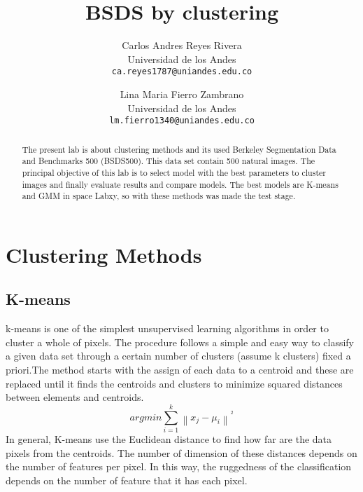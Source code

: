 \documentclass[10pt,twocolumn,letterpaper]{article}
\begin{document}
\title{BSDS by clustering  }

\author{Carlos Andres Reyes Rivera\\
Universidad de los Andes\\
{\tt\small ca.reyes1787@uniandes.edu.co}
\and
Lina Maria Fierro Zambrano\\
Universidad de los Andes\\
{\tt\small lm.fierro1340@uniandes.edu.co}
}

\maketitle

\begin{abstract}

The present lab is about clustering methods and its used Berkeley Segmentation Data and Benchmarks 500 (BSDS500). This data set contain 500 natural images. The principal objective of this lab is to select model with the best parameters to cluster images and finally evaluate results and compare models. The best models are K-means and GMM in space Labxy, so with these methods was made the test stage. 


\end{abstract}

\section{Clustering Methods}

\subsection{K-means}
k-means is one of the simplest unsupervised learning algorithms in order to cluster a whole of pixels. The procedure follows a simple and easy way to classify a given data set through a certain number of clusters (assume k clusters) fixed a priori.The method starts with the assign of each data to a centroid and these are replaced until it finds the centroids and clusters to minimize squared distances between elements and centroids.\cite{Arbelaez}\\
\begin{equation} argmin\sum_{i=1}^{k} \left \| x_{j}-\mu _{i} \right \|^{^{2}}
\end{equation}
In general, K-means use the Euclidean distance to find how far are the data pixels from the centroids. The number of dimension of these distances depends on the number of features per pixel\cite{Guestrin2007}. In this way,  the ruggedness of the classification depends on the number of feature that it has each pixel.\\
 
\end{document}
